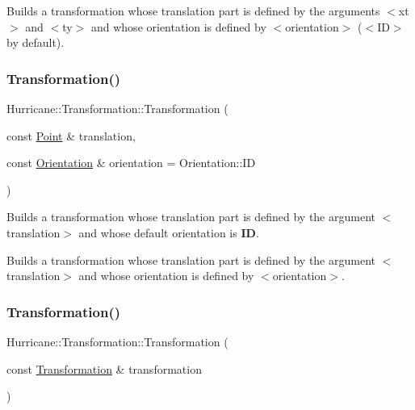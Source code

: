 Builds a transformation whose translation part is defined by the arguments {\ttfamily $<$xt$>$} and {\ttfamily $<$ty$>$} and whose orientation is defined by {\ttfamily $<$orientation$>$} ({\ttfamily $<$ID$>$} by default). \mbox{\label{classHurricane_1_1Transformation_a01a6844815e536ca38d549a13b6c034f}} 
\subsubsection{\texorpdfstring{Transformation()}{Transformation()}\hspace{0.1cm}{\footnotesize\ttfamily [3/4]}}
{\footnotesize\ttfamily Hurricane\+::\+Transformation\+::\+Transformation (\begin{DoxyParamCaption}\item[{const \hyperlink{classHurricane_1_1Point}{Point} \&}]{translation,  }\item[{const \hyperlink{classHurricane_1_1Transformation_1_1Orientation}{Orientation} \&}]{orientation = {\ttfamily Orientation\+:\+:ID} }\end{DoxyParamCaption})}

Builds a transformation whose translation part is defined by the argument {\ttfamily $<$translation$>$} and whose default orientation is {\bfseries ID}.

Builds a transformation whose translation part is defined by the argument {\ttfamily $<$translation$>$} and whose orientation is defined by {\ttfamily $<$orientation$>$}. \mbox{\label{classHurricane_1_1Transformation_acd94913a75fd4d3624b89e50acf4962f}} 
\subsubsection{\texorpdfstring{Transformation()}{Transformation()}\hspace{0.1cm}{\footnotesize\ttfamily [4/4]}}
{\footnotesize\ttfamily Hurricane\+::\+Transformation\+::\+Transformation (\begin{DoxyParamCaption}\item[{const \hyperlink{classHurricane_1_1Transformation}{Transformation} \&}]{transformation }\end{DoxyParamCaption})}

